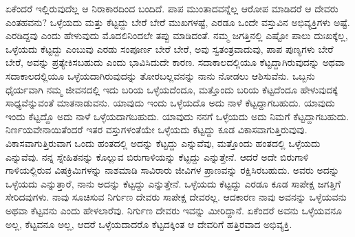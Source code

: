ಏಕೆಂದರೆ ಇಲ್ಲಿರುವುದೆಲ್ಲ ಆ ನಿರಾಕಾರದಿಂದ ಬಂದಿದೆ. ಪಾಪ ಮುಂತಾದವನ್ನೆಲ್ಲ ಆರೋಪ ಮಾಡಿದರೆ ಆ ದೇವರು ಎಂತಹವನು? ಒಳ್ಳೆಯದು ಮತ್ತು ಕೆಟ್ಟದ್ದು ಬೇರೆ ಬೇರೆ ಮುಖಗಳಷ್ಟೆ, ಎರಡೂ ಒಂದೇ ವಸ್ತುವಿನ ಅಭಿವ್ಯಕ್ತಿಗಳು ಅಷ್ಟೆ. ಎರಡಿದ್ದವು ಎಂದು ಹೇಳುವುದು ಮೊದಲಿನಿಂದಲೇ ತಪ್ಪು ಮಾಡಿದಂತೆ. ನಮ್ಮ ಜಗತ್ತಿನಲ್ಲಿ ಎಷ್ಟೋ ಪಾಲು ದುಃಖಕ್ಕೆಲ್ಲ, ಒಳ್ಳೆಯದು ಕೆಟ್ಟದ್ದು ಎಂಬುವು ಎರಡು ಸಂಪೂರ್ಣ ಬೇರೆ ಬೇರೆ, ಅವು ಸ್ವತಂತ್ರವಾದುವು, ಪಾಪ ಪುಣ್ಯಗಳು ಬೇರೆ ಬೇರೆ, ಅವನ್ನು ಪ್ರತ್ಯೇಕಿಸಬಹುದು ಎಂದು ಭಾವಿಸಿದುದೇ ಕಾರಣ. ಸದಾಕಾಲದಲ್ಲಿಯೂ ಕೆಟ್ಟದ್ದಾಗಿರುವುದನ್ನು ಅಥವಾ ಸದಾಕಾಲದಲ್ಲಿಯೂ ಒಳ್ಳೆಯದಾಗಿರುವುದನ್ನು ತೋರಬಲ್ಲವನನ್ನು ನಾನು ನೋಡಲು ಆಶಿಸುವೆನು. ಒಬ್ಬನು ಧೈರ್ಯವಾಗಿ ನಮ್ಮ ಜೀವನದಲ್ಲಿ ಇದು ಬರಿಯ ಒಳ್ಳೆಯದೆಂದೂ, ಮತ್ತೊಂದು ಬರಿಯ ಕೆಟ್ಟದೆಂದೂ ಹೇಳುವುದಕ್ಕೆ ಸಾಧ್ಯವೆನ್ನುವಂತೆ ಮಾತನಾಡುವನು. ಯಾವುದು ಇಂದು ಒಳ್ಳೆಯದೊ ಅದು ನಾಳೆ ಕೆಟ್ಟದ್ದಾಗಬಹುದು. ಯಾವುದು ಇಂದು ಕೆಟ್ಟದ್ದೊ ಅದು ನಾಳೆ ಒಳ್ಳೆಯದಾಗಬಹುದು. ಯಾವುದು ನನಗೆ ಒಳ್ಳೆಯದು ಅದು ನಿಮಗೆ ಕೆಟ್ಟದ್ದಾಗಬಹುದು. ನಿರ್ಣಯವೇನಾಯಿತೆಂದರೆ ಇತರ ವಸ್ತುಗಳಂತೆಯೇ ಒಳ್ಳೆಯದು ಕೆಟ್ಟದ್ದು ಕೂಡ ವಿಕಾಸವಾಗುತ್ತಿರುವುವು. ವಿಕಾಸವಾಗುತ್ತಿರುವಾಗ ಒಂದು ಹಂತದಲ್ಲಿ ಅದನ್ನು ಕೆಟ್ಟದ್ದು ಎನ್ನುವೆವು, ಮತ್ತೊಂದು ಹಂತದಲ್ಲಿ ಒಳ್ಳೆಯದು ಎನ್ನುವೆವು. ನನ್ನ ಸ್ನೇಹಿತನನ್ನು ಕೊಲ್ಲುವ ಬಿರುಗಾಳಿಯನ್ನು ಕೆಟ್ಟದ್ದು ಎನ್ನುತ್ತೇನೆ. ಆದರೆ ಅದೇ ಬಿರುಗಾಳಿ ಗಾಳಿಯಲ್ಲಿರುವ ವಿಷಕ್ರಿಮಿಗಳನ್ನು ನಾಶಮಾಡಿ ಸಾವಿರಾರು ಜೀವಿಗಳ ಪ್ರಾಣವನ್ನು ರಕ್ಷಿಸಿರಬಹುದು. ಅವರು ಅದನ್ನು ಒಳ್ಳೆಯದು ಎನ್ನುತ್ತಾರೆ, ನಾನು ಅದನ್ನು ಕೆಟ್ಟದ್ದು ಎನ್ನುತ್ತೇನೆ. ಒಳ್ಳೆಯದು ಕೆಟ್ಟದ್ದು ಎರಡೂ ಕೂಡ ಸಾಪೇಕ್ಷ ಜಗತ್ತಿಗೆ ಸೇರಿದವುಗಳು. ನಾವು ಸೂಚಿಸುವ ನಿರ್ಗುಣ ದೇವರು ಸಾಪೇಕ್ಷ ದೇವರಲ್ಲ. ಆದಕಾರಣ ನಾವು ಅವನನ್ನು ಒಳ್ಳೆಯವನು ಅಥವಾ ಕೆಟ್ಟವನು ಎಂದು ಹೇಳಲಾರೆವು. ನಿರ್ಗುಣ ದೇವರು ಇವನ್ನು ಮೀರಿದ್ದಾನೆ. ಏಕೆಂದರೆ ಅವನು ಒಳ್ಳೆಯವನೂ ಅಲ್ಲ, ಕೆಟ್ಟವನೂ ಅಲ್ಲ, ಆದರೆ ಒಳ್ಳೆಯದಾದರೊ ಕೆಟ್ಟದಕ್ಕಿಂತ ಆ ದೇವರಿಗೆ ಹತ್ತಿರವಾದ ಅಭಿವ್ಯಕ್ತಿ.

